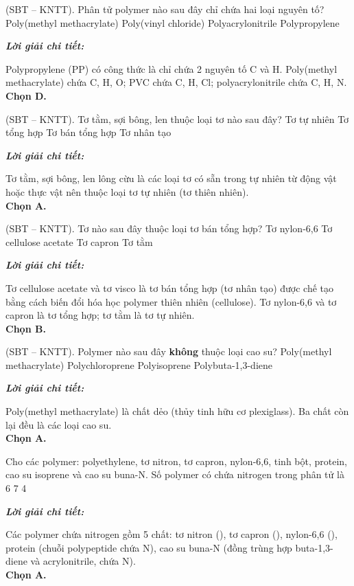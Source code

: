 \documentclass[11pt,a4paper]{article}
\def\loigiai#1{
\par\begingroup\color{blue!80!black}\small
\noindent\textbf{\textit{Lời giải chi tiết:}}\par
#1\par\endgroup}
\begin{document}
\begin{ex}
(SBT -- KNTT). Phân tử polymer nào sau đây chỉ chứa hai loại nguyên tố?
\choice
{Poly(methyl methacrylate)}
{Poly(vinyl chloride)}
{Polyacrylonitrile}
{\True Polypropylene}
\loigiai{
Polypropylene (PP) có công thức là \ce{[-CH2-CH(CH3)-]_n} chỉ chứa 2 nguyên tố C và H. Poly(methyl methacrylate) chứa C, H, O; PVC chứa C, H, Cl; polyacrylonitrile chứa C, H, N.\\
\textbf{Chọn D.}}
\end{ex}

\begin{ex}
(SBT -- KNTT). Tơ tằm, sợi bông, len thuộc loại tơ nào sau đây?
\choice
{\True Tơ tự nhiên}
{Tơ tổng hợp}
{Tơ bán tổng hợp}
{Tơ nhân tạo}
\loigiai{
Tơ tằm, sợi bông, len lông cừu là các loại tơ có sẵn trong tự nhiên từ động vật hoặc thực vật nên thuộc loại tơ tự nhiên (tơ thiên nhiên).\\
\textbf{Chọn A.}}
\end{ex}

\begin{ex}
(SBT -- KNTT). Tơ nào sau đây thuộc loại tơ bán tổng hợp?
\choice
{Tơ nylon-6,6}
{\True Tơ cellulose acetate}
{Tơ capron}
{Tơ tằm}
\loigiai{
Tơ cellulose acetate và tơ visco là tơ bán tổng hợp (tơ nhân tạo) được chế tạo bằng cách biến đổi hóa học polymer thiên nhiên (cellulose). Tơ nylon-6,6 và tơ capron là tơ tổng hợp; tơ tằm là tơ tự nhiên.\\
\textbf{Chọn B.}}
\end{ex}

\begin{ex}
(SBT -- KNTT). Polymer nào sau đây \textbf{không} thuộc loại cao su?
\choice
{\True Poly(methyl methacrylate)}
{Polychloroprene}
{Polyisoprene}
{Polybuta-1,3-diene}
\loigiai{
Poly(methyl methacrylate) là chất dẻo (thủy tinh hữu cơ plexiglass). Ba chất còn lại đều là các loại cao su.\\
\textbf{Chọn A.}}
\end{ex}

\begin{ex}
Cho các polymer: polyethylene, tơ nitron, tơ capron, nylon-6,6, tinh bột, protein, cao su isoprene và cao su buna-N. Số polymer có chứa nitrogen trong phân tử là
\choice
{}
{6}
{7}
{4}
\loigiai{
Các polymer chứa nitrogen gồm 5 chất: tơ nitron (\ce{[-CH2-CH(CN)-]_n}), tơ capron (\ce{[-NH-(CH2)5-CO-]_n}), nylon-6,6 (\ce{[-NH-(CH2)6-NH-CO-(CH2)4-CO-]_n}), protein (chuỗi polypeptide chứa N), cao su buna-N (đồng trùng hợp buta-1,3-diene và acrylonitrile, chứa N).\\
\textbf{Chọn A.}}
\end{ex}
\end{document}
